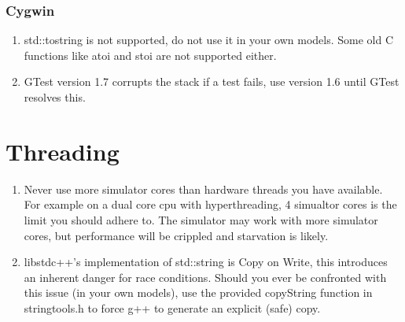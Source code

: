 \subsubsection{Cygwin}
\begin{enumerate}
\item std::to\textunderscore string is not supported, do not use it in your own models. Some old C functions like atoi and stoi are not supported either.
\item GTest version 1.7 corrupts the stack if a test fails, use version 1.6 until GTest resolves this.
\end{enumerate}

\section{Threading}
\begin{enumerate}
\item Never use more simulator cores than hardware threads you have available. For example on a dual core cpu with hyperthreading, 4 simualtor cores is the limit you should adhere to. The simulator may work with more simulator cores, but performance will be crippled and starvation is likely.
\item libstdc++'s implementation of std::string is Copy on Write, this introduces an inherent danger for race conditions. Should you ever be confronted with this issue (in your own models), use the provided copyString function in stringtools.h to force g++ to generate an explicit (safe) copy.
\end{enumerate}